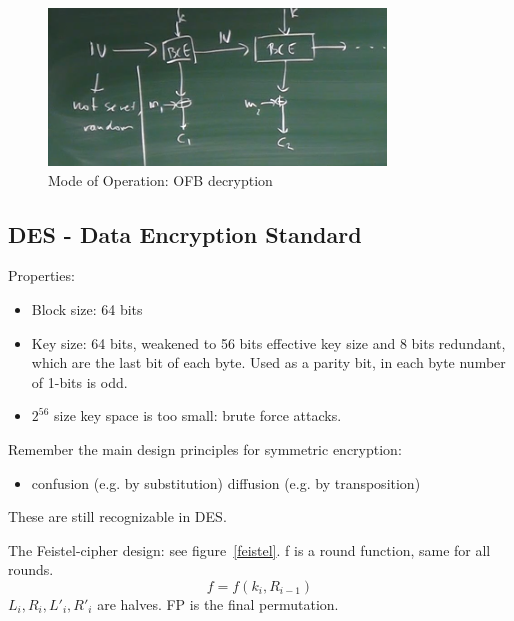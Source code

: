 \documentclass[language=english,number=]{homework}
\begin{document}
\begin{figure}
    \centering
    \includegraphics[width=\textwidth]{ofb.PNG}
    \caption{Mode of Operation: OFB decryption}
    \label{ofb}
\end{figure}

    \subsection{DES - Data Encryption Standard}

    Properties:
    \begin{itemize}
        \item Block size: 64 bits
        \item Key size: 64 bits, weakened to 56 bits effective key size and 8 bits redundant, which are the last bit of each byte.
        Used as a parity bit, in each byte number of 1-bits is odd.
        \item $2^{56}$ size key space is too small: brute force attacks.
    \end{itemize}

    Remember the main design principles for symmetric encryption:
    \begin{itemize}
        \item confusion (e.g. by substitution)
        \ite diffusion (e.g. by transposition)
    \end{itemize}
    These are still recognizable in DES.

    The Feistel-cipher design: see figure~\ref{feistel}.
    f is a round function, same for all rounds.
    \[
        f = f(k_i, R_{i-1})
    \]
    $L_i,R_i,L'_{i}, R'_i$ are halves.
    FP is the final permutation.
\end{document}
